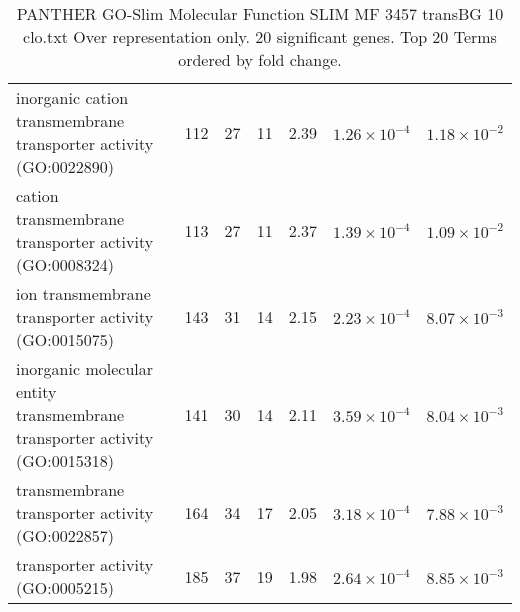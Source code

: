 \begin{table}[ht]
\begin{adjustbox}{width=\textwidth}
\begin{tabular}{lrrrlrr}
  inorganic cation transmembrane transporter activity (GO:0022890) & 112 & 27 & 11 & 2.39 & $1.26 \times 10^{-4}$ & $1.18 \times 10^{-2}$ \\ 
  cation transmembrane transporter activity (GO:0008324) & 113 & 27 & 11 & 2.37 & $1.39 \times 10^{-4}$ & $1.09 \times 10^{-2}$ \\ 
  ion transmembrane transporter activity (GO:0015075) & 143 & 31 & 14 & 2.15 & $2.23 \times 10^{-4}$ & $8.07 \times 10^{-3}$ \\ 
  inorganic molecular entity transmembrane transporter activity (GO:0015318) & 141 & 30 & 14 & 2.11 & $3.59 \times 10^{-4}$ & $8.04 \times 10^{-3}$ \\ 
  transmembrane transporter activity (GO:0022857) & 164 & 34 & 17 & 2.05 & $3.18 \times 10^{-4}$ & $7.88 \times 10^{-3}$ \\ 
  transporter activity (GO:0005215) & 185 & 37 & 19 & 1.98 & $2.64 \times 10^{-4}$ & $8.85 \times 10^{-3}$ \\ 
   \hline
\end{tabular}
\end{adjustbox}
\caption{PANTHER GO-Slim Molecular Function SLIM MF 3457 transBG 10 clo.txt Over representation only. 20 significant genes. Top 20 Terms ordered by fold change. } 
\label{tab:PANTHER GO-Slim Molecular Function SLIM MF 3457 transBG 10 clo.txt Over representation only. 20 significant genes. Top 20 Terms ordered by fold change. }
\end{table}


